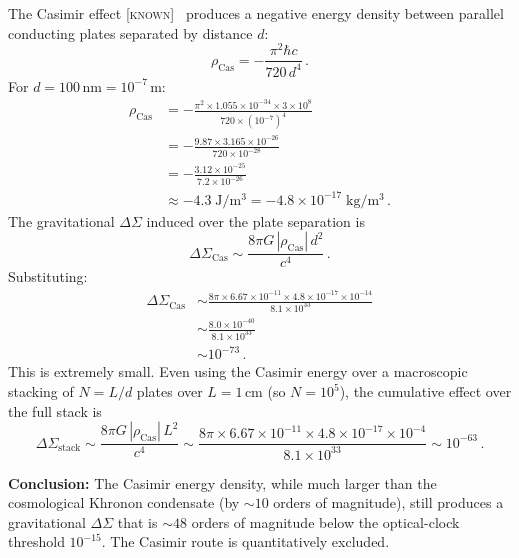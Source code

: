 \documentclass[prd,twocolumn,superscriptaddress,longbibliography,floatfix]{revtex4-2}
\newcommand{\DSigma}{\Delta\Sigma}
\newcommand{\rhoCas}{\rho_{\mathrm{Cas}}}
\newcommand{\known}{\textsc{[known]}}
\begin{document}
The Casimir effect \known~\cite{Casimir1948,Lamoreaux1997} produces a
negative energy density between parallel conducting plates separated
by distance $d$:
\begin{equation}
  \rhoCas = -\frac{\pi^2\hbar c}{720\,d^4}\,.
  \label{eq:rho-casimir}
\end{equation}
For $d = 100\,\mathrm{nm} = 10^{-7}\,\mathrm{m}$:
\begin{align}
  \rhoCas &= -\frac{\pi^2 \times 1.055 \times 10^{-34}
  \times 3 \times 10^8}{720 \times (10^{-7})^4}
  \nonumber \\
  &= -\frac{9.87 \times 3.165 \times 10^{-26}}
  {720 \times 10^{-28}}
  \nonumber \\
  &= -\frac{3.12 \times 10^{-25}}{7.2 \times 10^{-26}}
  \nonumber \\
  &\approx -4.3\;\mathrm{J/m^3}
  = -4.8 \times 10^{-17}\;\mathrm{kg/m^3}\,.
  \label{eq:rho-casimir-num}
\end{align}
The gravitational $\DSigma$ induced over the plate separation is
\begin{equation}
  \DSigma_{\mathrm{Cas}} \sim \frac{8\pi G\,|\rhoCas|\,d^2}{c^4}\,.
  \label{eq:dsigma-casimir}
\end{equation}
Substituting:
\begin{align}
  \DSigma_{\mathrm{Cas}} &\sim
  \frac{8\pi \times 6.67 \times 10^{-11} \times 4.8 \times 10^{-17}
  \times 10^{-14}}{8.1 \times 10^{33}}
  \nonumber \\
  &\sim \frac{8.0 \times 10^{-40}}{8.1 \times 10^{33}}
  \nonumber \\
  &\sim 10^{-73}\,.
  \label{eq:dsigma-casimir-num}
\end{align}
This is extremely small.  Even using the Casimir energy over a
macroscopic stacking of $N = L/d$ plates over $L = 1\,\mathrm{cm}$
(so $N = 10^5$), the cumulative effect over the full stack is
\begin{equation}
  \DSigma_{\mathrm{stack}} \sim \frac{8\pi G\,|\rhoCas|\,L^2}{c^4}
  \sim \frac{8\pi \times 6.67 \times 10^{-11} \times 4.8 \times 10^{-17}
  \times 10^{-4}}{8.1 \times 10^{33}}
  \sim 10^{-63}\,.
  \label{eq:dsigma-stack}
\end{equation}

\textbf{Conclusion:} The Casimir energy density, while much larger than
the cosmological Khronon condensate (by $\sim 10$ orders of magnitude),
still produces a gravitational $\DSigma$ that is $\sim 48$ orders of
magnitude below the optical-clock threshold $10^{-15}$.  The Casimir
route is quantitatively excluded.
\end{document}
